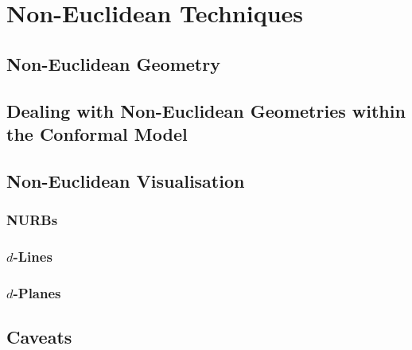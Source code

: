 \chapter{Non-Euclidean Techniques}

\section{Non-Euclidean Geometry}
\section{Dealing with Non-Euclidean Geometries within the Conformal Model}
\section{Non-Euclidean Visualisation}
\subsection{NURBs}
\subsection{$d$-Lines}
\subsection{$d$-Planes}
\section{Caveats}
